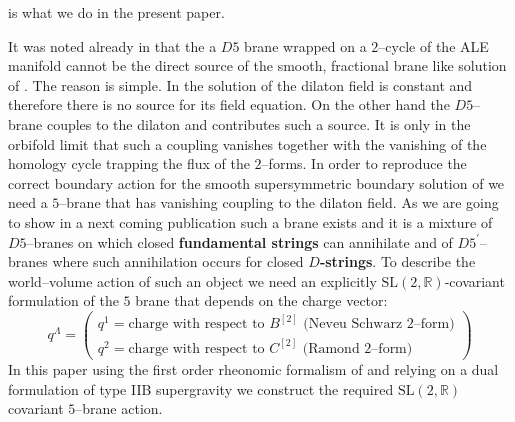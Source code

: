 \documentclass[a4paper,11pt]{article}
\begin{document}
is what we do in the present paper.
\par
It was noted already in \cite{copetorino1,noialtrilast,copetorino2}
that the a $D5$ brane wrapped on a $2$--cycle of the ALE manifold
cannot be the direct source of the smooth, fractional brane like
solution of \cite{noialtrilast}. The reason is simple. In the
solution of \cite{noialtrilast} the dilaton field is constant and
therefore there is no source for its field equation. On the other
hand the $D5$--brane couples to the dilaton and contributes such a
source. It is only in the orbifold limit that such a coupling
vanishes together with the vanishing of the homology cycle trapping
the flux of the $2$--forms. In order to reproduce the correct
boundary action for the smooth supersymmetric boundary solution of
\cite{noialtrilast} we need a $5$--brane that has vanishing coupling
to the dilaton field. As we are going to show in a next coming
publication \cite{noiprossimo} such a brane exists and it is a mixture of $D5$--branes
on which closed \textbf{fundamental strings} can annihilate and of
$D5^\prime$--branes where such annihilation occurs for closed
\textbf{$D$-strings}. To describe the world--volume action of such an
object we need an explicitly $\mathrm{SL(2,\mathbb{R})}$-covariant
formulation of the $5$ brane that depends on the charge vector:
\begin{equation}
  q^\Lambda = \left(\begin{array}{l}
    q^1 = \mbox{charge with respect to $B^{[2]}$ (Neveu Schwarz $2$--form)} \\
    q^2 = \mbox{charge with respect to $C^{[2]}$ (Ramond  $2$--form)} \
  \end{array} \right)
\label{chargevectoril}
\end{equation}
In this paper using the first order rheonomic formalism of
\cite{noidued3} and relying on a dual formulation of type IIB
supergravity we construct the required $\mathrm{SL(2,\mathbb{R})}$
covariant $5$--brane action.
\end{document}
